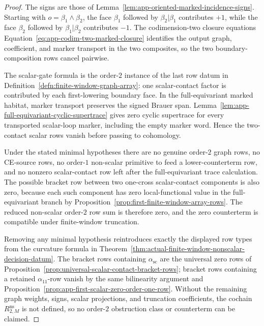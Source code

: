 \begin{proof}
  The signs are those of
  Lemma~\ref{lem:app-oriented-marked-incidence-signs}.  Starting with
  \(o=\beta_1\wedge\beta_2\), the face \(\beta_1\) followed by
  \(\beta_2|\beta_1\) contributes \(+1\), while the face \(\beta_2\)
  followed by \(\beta_1|\beta_2\) contributes \(-1\).  The
  codimension-two closure equations
  Equation~\eqref{eq:app-codim-two-marked-closure} identifies the output graph,
  coefficient, and marker transport in the two composites, so the two
  boundary-composition rows cancel pairwise.

  The scalar-gate formula is the order-\(2\) instance of the last row datum
  in Definition~\ref{defn:finite-window-graph-array}: one scalar-contact
  factor is contributed by each first-lowering boundary face.  In the
  full-equivariant marked habitat, marker transport preserves the signed
  Brauer span.  Lemma~\ref{lem:app-full-equivariant-cyclic-supertrace}
  gives zero cyclic supertrace for every transported scalar-loop marker,
  including the empty marker word.  Hence the two-contact scalar rows
  vanish before passing to cohomology.

  Under the stated minimal hypotheses there are no genuine order-\(2\)
  graph rows, no CE-source rows, no order-\(1\) non-scalar primitive to
  feed a lower-counterterm row, and no nonzero scalar-contact row left
  after the full-equivariant trace calculation.  The possible bracket row
  between two one-cross scalar-contact components is also zero, because
  each such component has zero local-functional value in the
  full-equivariant branch by
  Proposition~\ref{prop:first-finite-window-array-rows}.  The reduced
  non-scalar order-\(2\) row sum is therefore zero, and the zero
  counterterm is compatible under finite-window truncation.

  Removing any minimal hypothesis reintroduces exactly the displayed row
  types from the curvature formula in
  Theorem~\ref{thm:actual-finite-window-nonscalar-decision-datum}.  The
  bracket rows containing \(\alpha_{\mathrm{sc}}\) are the universal zero
  rows of
  Proposition~\ref{prop:universal-scalar-contact-bracket-rows}; bracket rows
  containing a retained \(\alpha_{11}\)-row vanish by the same bilinearity
  argument and
  Proposition~\ref{prop:app-first-scalar-zero-order-one-row}.  Without the
  remaining graph weights, signs, scalar projections, and truncation
  coefficients, the cochain \(R^{\mathrm{ns}}_{2,M}\) is not defined, so no
  order-\(2\) obstruction class or counterterm can be claimed.
\end{proof}


